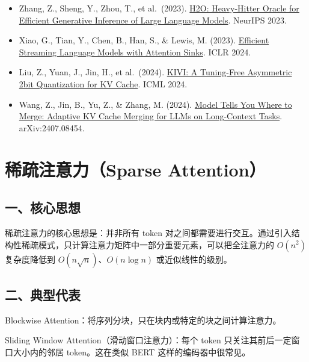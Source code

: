 \vspace{0.25em}
\begin{itemize}
\tightlist
\item
  Zhang, Z., Sheng, Y., Zhou, T., et al.~(2023). \href{https://arxiv.org/abs/2306.14048}{H2O: Heavy-Hitter Oracle for Efficient Generative Inference of Large Language Models}. NeurIPS 2023.
\item
  Xiao, G., Tian, Y., Chen, B., Han, S., \& Lewis, M. (2023). \href{https://arxiv.org/abs/2309.17453}{Efficient Streaming Language Models with Attention Sinks}. ICLR 2024.
\item
  Liu, Z., Yuan, J., Jin, H., et al.~(2024). \href{https://arxiv.org/abs/2402.02750}{KIVI: A Tuning-Free Asymmetric 2bit Quantization for KV Cache}. ICML 2024.
\item
  Wang, Z., Jin, B., Yu, Z., \& Zhang, M. (2024). \href{https://arxiv.org/abs/2407.08454}{Model Tells You Where to Merge: Adaptive KV Cache Merging for LLMs on Long-Context Tasks}. arXiv:2407.08454.
\end{itemize}

\clearpage

\hypertarget{ux7a00ux758fux6ce8ux610fux529bsparse-attention}{%
\section{稀疏注意力（Sparse Attention）}\label{ux7a00ux758fux6ce8ux610fux529bsparse-attention}}

\hypertarget{ux4e00ux6838ux5fc3ux601dux60f3-8}{%
\subsection{一、核心思想}\label{ux4e00ux6838ux5fc3ux601dux60f3-8}}

稀疏注意力的核心思想是：并非所有 token 对之间都需要进行交互。通过引入结构性稀疏模式，只计算注意力矩阵中一部分重要元素，可以把全注意力的 \(O(n^2)\) 复杂度降低到 \(O(n\sqrt{n})\)、\(O(n\log n)\) 或近似线性的级别。

\hypertarget{ux4e8cux5178ux578bux4ee3ux8868}{%
\subsection{二、典型代表}\label{ux4e8cux5178ux578bux4ee3ux8868}}

Blockwise Attention：将序列分块，只在块内或特定的块之间计算注意力。

Sliding Window Attention（滑动窗口注意力）：每个 token 只关注其前后一定窗口大小内的邻居 token。这在类似 BERT 这样的编码器中很常见。

